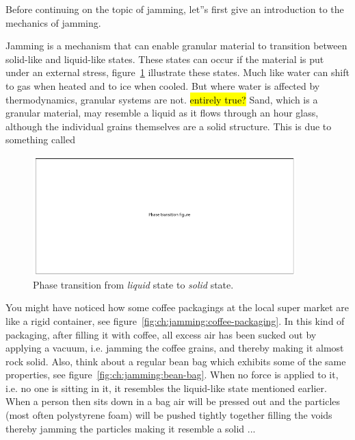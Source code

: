 Before continuing on the topic of jamming, let''s first give an introduction to the mechanics of jamming.

Jamming is a mechanism that can enable granular material to transition between solid-like and liquid-like states. These states can occur if the material is put under an external stress, figure~\ref{fig:ch:jamming:phase-transition} illustrate these states.
Much like water can shift to gas when heated and to ice when cooled. But where water is affected by thermodynamics, granular systems are not. \hl{entirely true?}
Sand, which is a granular material, may resemble a liquid as it flows through an hour glass, although the individual grains themselves are a solid structure. This is due to something called 

\begin{figure}[hb]
	\centering
  		\includegraphics[width=4in]{figures/jamming/phase_transition}
	\caption[Phase transition from \textit{liquid} state to \textit{solid} state.]
   {Phase transition from \textit{liquid} state to \textit{solid} state.}
   \label{fig:ch:jamming:phase-transition}
\end{figure}

You might have noticed how some coffee packagings at the local super market are like a rigid container, see figure~\ref{fig:ch:jamming:coffee-packaging}. 
In this kind of packaging, after filling it with coffee, all excess air has been sucked out by applying a vacuum, i.e. jamming the coffee grains, and thereby making it almost rock solid. 
Also, think about a regular bean bag which exhibits some of the same properties, see figure~\ref{fig:ch:jamming:bean-bag}. 
When no force is applied to it, i.e. no one is sitting in it, it resembles the liquid-like state mentioned earlier. 
When a person then sits down in a bag air will be pressed out and the particles (most often polystyrene foam) will be pushed tightly together filling the voids   thereby jamming the particles making it resemble a solid ...

